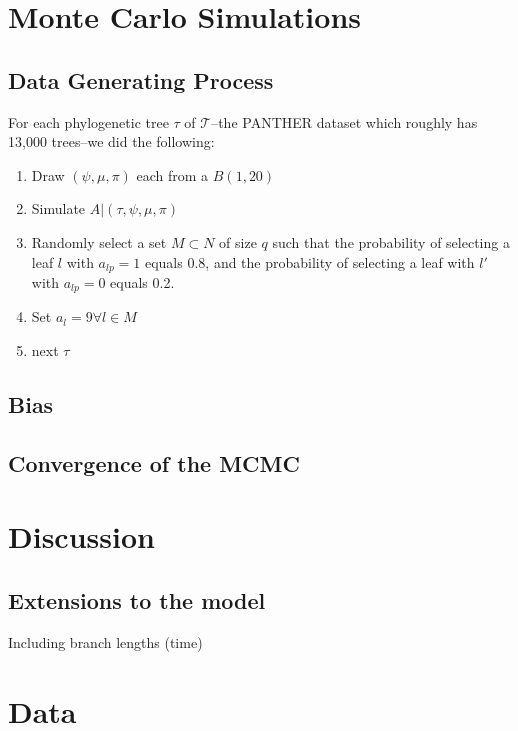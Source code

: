 \documentclass{article}
\begin{document}
\section{Monte Carlo Simulations}

\subsection{Data Generating Process}

For each phylogenetic tree $\tau$ of $\mathcal{T}$--the PANTHER dataset which roughly has 13,000 trees--we did the following:

\begin{enumerate}
	\item Draw $(\psi, \mu, \pi)$ each from a $B(1, 20)$
	\item Simulate $A | (\tau, \psi, \mu, \pi)$
	\item Randomly select a set $M\subset N$ of size $q$ such that the probability of selecting a leaf $l$ with $a_{lp} = 1$ equals 0.8, and the probability of selecting a leaf with $l'$ with $a_{lp} = 0$ equals 0.2.
	\item Set $a_l = 9 \forall l \in M$
	\item next $\tau$
\end{enumerate}

\subsection{Bias}


\subsection{Convergence of the MCMC}

\section{Discussion}

\subsection{Extensions to the model}

Including branch lengths (time)

\appendix

\section{Data}
\end{document}
